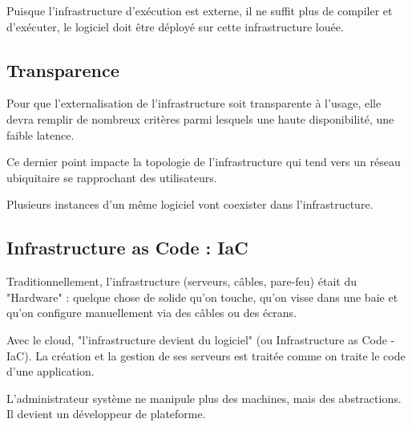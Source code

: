 \documentclass{rapportClass} %
\begin{document}
Puisque l'infrastructure d'exécution est externe, il ne suffit plus de
compiler et d'exécuter, le logiciel doit être déployé sur cette infrastructure louée.

\subsection{Transparence}
Pour que l'externalisation de l'infrastructure soit transparente à l'usage, elle
devra remplir de nombreux critères parmi lesquels une haute
disponibilité, une faible latence.

Ce dernier point impacte la topologie de l'infrastructure qui tend
vers un réseau ubiquitaire se rapprochant des utilisateurs.

Plusieurs instances d'un même logiciel vont coexister dans l'infrastructure.


\subsection{Infrastructure as Code : IaC}

Traditionnellement, l'infrastructure (serveurs, câbles, pare-feu)
était du "Hardware" : quelque chose de solide qu'on touche, qu'on
visse dans une baie et qu'on configure manuellement via des câbles ou
des écrans.

Avec le cloud, "l'infrastructure devient du logiciel" (ou
Infrastructure as Code - IaC). La création et la gestion de ses
serveurs est traitée comme on traite le code d'une application.

L'administrateur système ne manipule plus des machines, mais des
abstractions. Il devient un développeur de plateforme.
\end{document}
